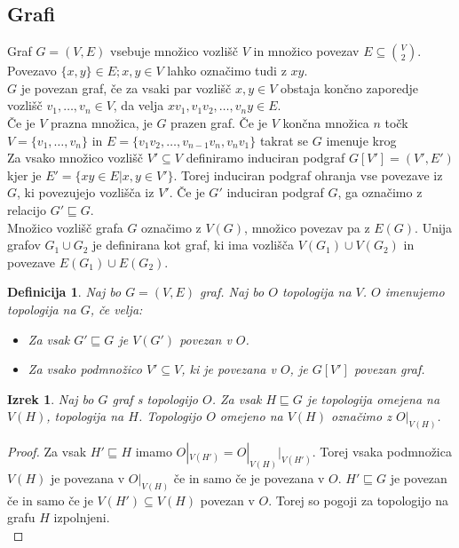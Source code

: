 \documentclass[mat1, tisk]{fmfdelo}
\newtheorem{definition}{Definicija}[subsection]
\newtheorem{theorem}{Izrek}[subsection]
\begin{document}
\subsection{Grafi}
Graf $G = (V,E)$ vsebuje množico vozlišč $V$ in množico povezav $E \subseteq \binom{V}{2}$.
Povezavo $\{x,y\} \in E; x,y \in V$ lahko označimo tudi z $xy$.\\
$G$ je povezan graf, če za vsaki par vozlišč $x,y \in V$ obstaja končno zaporedje
vozlišč $v_1,\dots,v_n \in V$, da velja $xv_1, v_1v_2, \dots, v_n y \in E$.\\
Če je $V$ prazna množica, je $G$ prazen graf. Če je $V$ končna množica $n$ točk $V=\{v_1,\dots,v_n\}$
in $E=\{v_1 v_2,\dots,v_{n-1}v_n,v_n v_1\}$ takrat se $G$ imenuje krog \\
Za vsako množico vozlišč $V' \subseteq V$ definiramo induciran podgraf $G[V'] = (V',E')$
kjer je $E' = \{xy \in E | x,y \in V'\}$. Torej induciran podgraf ohranja vse povezave
iz $G$, ki povezujejo vozlišča iz $V'$. Če je $G'$ induciran podgraf $G$,
ga označimo z relacijo $G' \sqsubseteq  G$.\\
Množico vozlišč grafa $G$ označimo z $V(G)$, množico povezav pa z $E(G)$. Unija
grafov $G_1 \cup G_2$ je definirana kot graf, ki ima vozlišča $V(G_1) \cup V(G_2)$
in povezave $E(G_1) \cup E(G_2)$.\\
\begin{definition}
  Naj bo $G = (V,E)$ graf. Naj bo $O$ topologija na $V$. $O$ imenujemo topologija
  na $G$, če velja:
  \begin{itemize}
    \item[(1)] Za vsak $G' \sqsubseteq G$ je $V(G')$ povezan v $O$.
    \item[(2)] Za vsako podmnožico $V' \subseteq V$, ki je povezana v $O$, je $G[V']$ povezan graf.
  \end{itemize}
\end{definition}
\begin{theorem}
  Naj bo $G$ graf s topologijo $O$. Za vsak $H \sqsubseteq G$ je topologija
  omejena na $V(H)$, topologija na $H$. Topologijo $O$ omejeno na $V(H)$ označimo z $O|_{V(H)}$.
\end{theorem}
\begin{proof}
  Za vsak $H' \sqsubseteq H$ imamo $O|_{V(H')} = O|_{V(H)}|_{V(H')}$. Torej vsaka
  podmnožica $V(H)$ je povezana v $O|_{V(H)}$ če in samo če je povezana v $O$.
  $H' \sqsubseteq G$ je povezan če in samo če je $V(H') \subseteq V(H)$ povezan v $O$.
  Torej so pogoji za topologijo na grafu $H$ izpolnjeni. \\
\end{proof}
\end{document}
